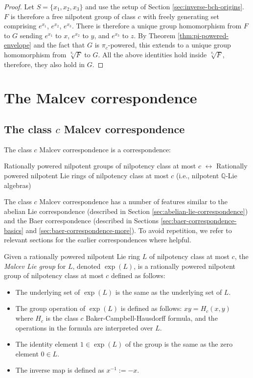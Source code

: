\begin{proof}
  Let $S = \{x_1,x_2,x_3\}$ and use the setup of Section
  \ref{sec:inverse-bch-origins}. $F$ is therefore a free nilpotent
  group of class $c$ with freely generating set comprising $e^{x_1}$,
  $e^{x_2}$, $e^{x_3}$. There is therefore a unique group homomorphism
  from $F$ to $G$ sending $e^{x_1}$ to $x$, $e^{x_2}$ to $y$, and
  $e^{x_3}$ to $z$. By Theorem \ref{thm:pi-powered-envelope} and the
  fact that $G$ is $\pi_c$-powered, this extends to a unique group
  homomorphism from $\sqrt[\pi_c]{F}$ to $G$. All the above identities
  hold inside $\sqrt[\pi_c]{F}$, therefore, they also hold in $G$.
\end{proof}


\section{The Malcev correspondence}\label{sec:malcev-correspondence}

\subsection{The class $c$ Malcev correspondence}

The class $c$ Malcev correspondence is a correspondence:

Rationally powered nilpotent groups of nilpotency class at most $c$
$\leftrightarrow$ Rationally powered nilpotent Lie rings of nilpotency
class at most $c$ (i.e., nilpotent $\mathbb{Q}$-Lie algebras)

The class $c$ Malcev correspondence has a number of features similar
to the abelian Lie correspondence (described in Section
\ref{sec:abelian-lie-correspondence}) and the Baer correspondence
(described in Sections \ref{sec:baer-correspondence-basics} and
\ref{sec:baer-correspondence-more}). To avoid repetition, we refer to
relevant sections for the earlier correspondences where helpful.

Given a rationally powered nilpotent Lie ring $L$ of nilpotency class
at most $c$, the {\em Malcev Lie group} for $L$, denoted $\exp(L)$, is
a rationally powered nilpotent group of nilpotency class at most $c$
defined as follows:

\begin{itemize}
\item The underlying set of $\exp(L)$ is the same as the underlying set of
  $L$.
\item The group operation of $\exp(L)$ is defined as follows: $xy =
  H_c(x,y)$ where $H_c$ is the class $c$ Baker-Campbell-Hausdorff
  formula, and the operations in the formula are interpreted over $L$.
\item The identity element $1 \in \exp(L)$ of the group is the same as the
  zero element $0 \in L$.
\item The inverse map is defined as $x^{-1} := -x$.
\end{itemize}


